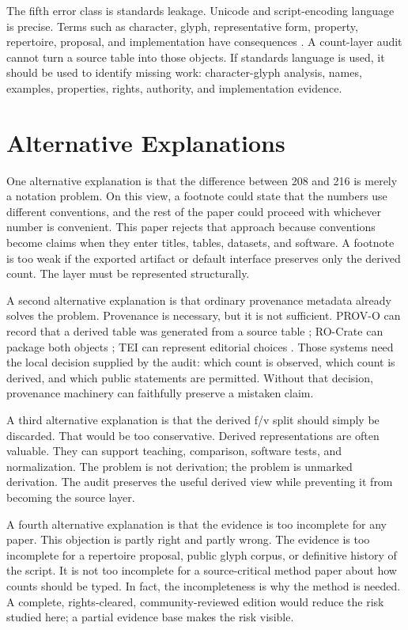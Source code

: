 \documentclass[sigconf,nonacm]{acmart}
\begin{document}
The fifth error class is standards leakage. Unicode and script-encoding
language is precise. Terms such as character, glyph, representative form,
property, repertoire, proposal, and implementation have consequences
\cite{unicode17CoreSpec,unicodeProposals}. A count-layer audit cannot turn a
source table into those objects. If standards language is used, it should be
used to identify missing work: character-glyph analysis, names, examples,
properties, rights, authority, and implementation evidence.

\section{Alternative Explanations}
One alternative explanation is that the difference between 208 and 216 is merely
a notation problem. On this view, a footnote could state that the numbers use
different conventions, and the rest of the paper could proceed with whichever
number is convenient. This paper rejects that approach because conventions
become claims when they enter titles, tables, datasets, and software. A
footnote is too weak if the exported artifact or default interface preserves
only the derived count. The layer must be represented structurally.

A second alternative explanation is that ordinary provenance metadata already
solves the problem. Provenance is necessary, but it is not sufficient. PROV-O
can record that a derived table was generated from a source table
\cite{w3cProvO}; RO-Crate can package both objects \cite{rocrate12}; TEI can
represent editorial choices \cite{teiP5Glyphs}. Those systems need the local
decision supplied by the audit: which count is observed, which count is
derived, and which public statements are permitted. Without that decision,
provenance machinery can faithfully preserve a mistaken claim.

A third alternative explanation is that the derived f/v split should simply be
discarded. That would be too conservative. Derived representations are often
valuable. They can support teaching, comparison, software tests, and
normalization. The problem is not derivation; the problem is unmarked
derivation. The audit preserves the useful derived view while preventing it
from becoming the source layer.

A fourth alternative explanation is that the evidence is too incomplete for any
paper. This objection is partly right and partly wrong. The evidence is too
incomplete for a repertoire proposal, public glyph corpus, or definitive
history of the script. It is not too incomplete for a source-critical method
paper about how counts should be typed. In fact, the incompleteness is why the
method is needed. A complete, rights-cleared, community-reviewed edition would
reduce the risk studied here; a partial evidence base makes the risk visible.
\end{document}
